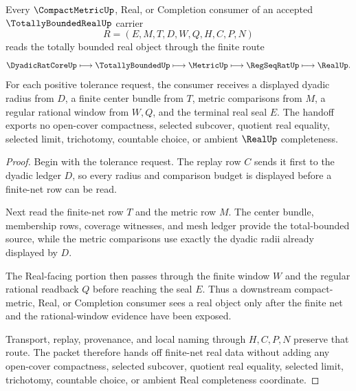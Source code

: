 \begin{theorem}
\label{thm:totally-bounded-real-finite-net-handoff}
Every $\CompactMetricUp$, Real, or Completion consumer of an accepted $\TotallyBoundedRealUp$ carrier
$$
R=(E,M,T,D,W,Q,H,C,P,N)
$$
reads the totally bounded real object through the finite route
$$
\DyadicRatCoreUp \longmapsto \TotallyBoundedUp \longmapsto \MetricUp \longmapsto \RegSeqRatUp \longmapsto \RealUp .
$$
For each positive tolerance request, the consumer receives a displayed dyadic radius from $D$, a finite center bundle from $T$, metric comparisons from $M$, a regular rational window from $W,Q$, and the terminal real seal $E$. The handoff exports no open-cover compactness, selected subcover, quotient real equality, selected limit, trichotomy, countable choice, or ambient $\RealUp$ completeness.
\end{theorem}
\begin{proof}
Begin with the tolerance request. The replay row $C$ sends it first to the dyadic ledger $D$, so every radius and comparison budget is displayed before a finite-net row can be read.

Next read the finite-net row $T$ and the metric row $M$. The center bundle, membership rows, coverage witnesses, and mesh ledger provide the total-bounded source, while the metric comparisons use exactly the dyadic radii already displayed by $D$.

The Real-facing portion then passes through the finite window $W$ and the regular rational readback $Q$ before reaching the seal $E$. Thus a downstream compact-metric, Real, or Completion consumer sees a real object only after the finite net and the rational-window evidence have been exposed.

Transport, replay, provenance, and local naming through $H,C,P,N$ preserve that route. The packet therefore hands off finite-net real data without adding any open-cover compactness, selected subcover, quotient real equality, selected limit, trichotomy, countable choice, or ambient Real completeness coordinate.
\end{proof}

